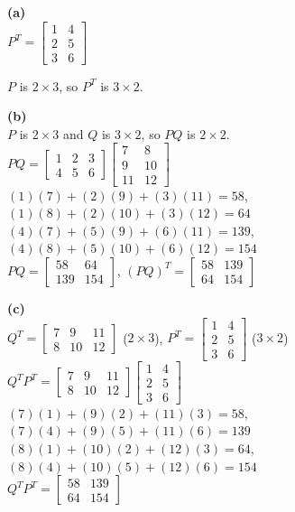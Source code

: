 \begin{solution}
\textbf{(a)} \\
$P^T = \begin{bmatrix} 1 & 4 \\ 2 & 5 \\ 3 & 6 \end{bmatrix}$

$P$ is $2 \times 3$, so $P^T$ is $3 \times 2$.

\medskip
\textbf{(b)} \\
$P$ is $2 \times 3$ and $Q$ is $3 \times 2$, so $PQ$ is $2 \times 2$. \\[6pt]
$PQ = \begin{bmatrix} 1 & 2 & 3 \\ 4 & 5 & 6 \end{bmatrix}\begin{bmatrix} 7 & 8 \\ 9 & 10 \\ 11 & 12 \end{bmatrix}$ \\[6pt]
$(1)(7)+(2)(9)+(3)(11) = 58$, \quad $(1)(8)+(2)(10)+(3)(12) = 64$ \\[3pt]
$(4)(7)+(5)(9)+(6)(11) = 139$, \quad $(4)(8)+(5)(10)+(6)(12) = 154$ \\[3pt]
$PQ = \begin{bmatrix} 58 & 64 \\ 139 & 154 \end{bmatrix}$, \quad
$(PQ)^T = \begin{bmatrix} 58 & 139 \\ 64 & 154 \end{bmatrix}$

\medskip
\textbf{(c)} \\
$Q^T = \begin{bmatrix} 7 & 9 & 11 \\ 8 & 10 & 12 \end{bmatrix}$ \quad ($2 \times 3$), \quad
$P^T = \begin{bmatrix} 1 & 4 \\ 2 & 5 \\ 3 & 6 \end{bmatrix}$ \quad ($3 \times 2$) \\[6pt]
$Q^T P^T = \begin{bmatrix} 7 & 9 & 11 \\ 8 & 10 & 12 \end{bmatrix}\begin{bmatrix} 1 & 4 \\ 2 & 5 \\ 3 & 6 \end{bmatrix}$ \\[6pt]
$(7)(1)+(9)(2)+(11)(3) = 58$, \quad $(7)(4)+(9)(5)+(11)(6) = 139$ \\[3pt]
$(8)(1)+(10)(2)+(12)(3) = 64$, \quad $(8)(4)+(10)(5)+(12)(6) = 154$ \\[3pt]
$Q^T P^T = \begin{bmatrix} 58 & 139 \\ 64 & 154 \end{bmatrix}$


\end{solution}

